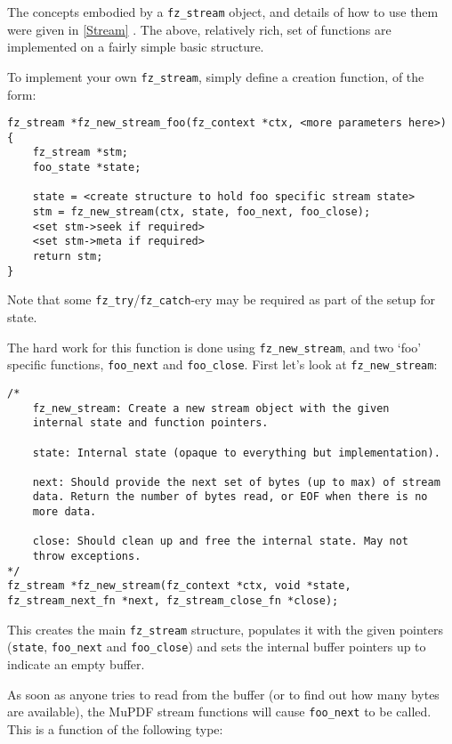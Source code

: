 \documentclass[oneside]{book}
\newcommand{\rjwref}[1] {\autoref{#1} \nameref{#1}}
\begin{document}
The concepts embodied by a \texttt{fz\_stream} object, and details of how to use them were given in \rjwref{Stream}. The above, relatively rich, set of functions are implemented on a fairly simple basic structure.

To implement your own \texttt{fz\_stream}, simply define a creation function, of the form:

\begin{lstlisting}
fz_stream *fz_new_stream_foo(fz_context *ctx, <more parameters here>)
{
	fz_stream *stm;
	foo_state *state;
	
	state = <create structure to hold foo specific stream state>
	stm = fz_new_stream(ctx, state, foo_next, foo_close);
	<set stm->seek if required>
	<set stm->meta if required>
	return stm;
}
\end{lstlisting}

Note that some \texttt{fz\_try}/\texttt{fz\_catch}-ery may be required as part of the setup for state.

The hard work for this function is done using \texttt{fz\_new\_stream}, and two `foo' specific functions, \texttt{foo\_next} and \texttt{foo\_close}. First let's look at \texttt{fz\_new\_stream}:

\begin{lstlisting}
/*
	fz_new_stream: Create a new stream object with the given
	internal state and function pointers.

	state: Internal state (opaque to everything but implementation).

	next: Should provide the next set of bytes (up to max) of stream
	data. Return the number of bytes read, or EOF when there is no
	more data.

	close: Should clean up and free the internal state. May not
	throw exceptions.
*/
fz_stream *fz_new_stream(fz_context *ctx, void *state, fz_stream_next_fn *next, fz_stream_close_fn *close);
\end{lstlisting}

This creates the main \texttt{fz\_stream} structure, populates it with the given pointers (\texttt{state}, \texttt{foo\_next} and \texttt{foo\_close}) and sets the internal buffer pointers up to indicate an empty buffer.

As soon as anyone tries to read from the buffer (or to find out how many bytes are available), the MuPDF stream functions will cause \texttt{foo\_next} to be called. This is a function of the following type:
\end{document}

